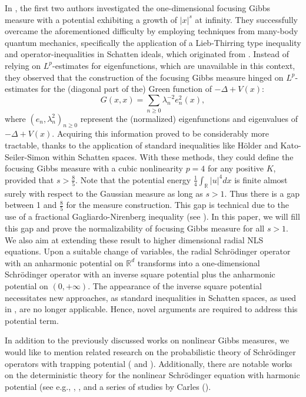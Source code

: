 \documentclass[%
11pt,  reqno]{amsart}
\theoremstyle{remarkstyle}
\newcommand{\1}{\hspace{0.2mm}\text{I}\hspace{0.2mm}}
\numberwithin{equation}{section}
\numberwithin{theorem}{section}
\begin{document}
	In \cite{DR23}, the first two authors investigated the one-dimensional focusing Gibbs measure with a potential exhibiting a growth of $|x|^s$ at infinity. They successfully overcame the aforementioned difficulty by employing techniques from many-body quantum mechanics, specifically the application of a Lieb-Thirring type inequality and operator-inequalities in Schatten ideals, which originated from \cite{LNR18}. Instead of relying on
	$L^p$-estimates for eigenfunctions, which are unavailable in this context, they observed that the construction of the focusing Gibbs measure hinged on $L^p$-estimates for the (diagonal part of the) Green function of $-\Delta + V(x)$:
	$$
	G(x,x) = \sum_{n\geq 0} \lambda_n^{-2} e^2_n(x),
	$$
	where $(e_n, \lambda_n^2)_{n\geq 0}$ represent the (normalized) eigenfunctions and eigenvalues of $-\Delta + V(x)$. Acquiring this information proved to be considerably more tractable, thanks to the application of standard inequalities like H\"older and Kato-Seiler-Simon within Schatten spaces. With these methods, they could define the focusing Gibbs measure with a cubic nonlinearity $p=4$ for any positive $K$, provided that $s>\frac{8}{5}$. Note that the potential energy $\frac{1}{4}\int_{\mathbb R} |u|^4 dx$ is finite almost surely with respect to the Gaussian measure as long as $s>1$. Thus there is a gap between 1 and $\frac{8}{5}$ for the measure construction. This gap is technical due to the use of a fractional Gagliardo-Nirenberg inequality (see \cite[Lemma 3.8]{DR23}). In this paper, we will fill this gap and prove the normalizability of focusing Gibbs measure for all $s>1$. We also aim at extending these result to higher dimensional radial NLS equations. Upon a suitable change of variables, the radial Schr\"odinger operator with an anharmonic potential on $\mathbb{R}^d$ transforms into a one-dimensional Schr\"odinger operator with an inverse square potential plus the anharmonic potential on $(0,+\infty)$. The appearance of the inverse square potential necessitates new approaches, as standard inequalities in Schatten spaces, as used in \cite{LNR18, DR23}, are no longer applicable. Hence, novel arguments are required to address this potential term.
	
	In addition to the previously discussed works on nonlinear Gibbs measures, we would like to mention related research on the probabilistic theory of Schrödinger operators with trapping potential (\cite{PoiRobTho-14} and \cite{RobTho-15}). Additionally, there are notable works on the deterministic theory for the nonlinear Schrödinger equation with harmonic potential (see e.g., \cite{KilVisZha-09}, \cite{Jao-16}, and a series of studies by Carles (\cite{Car-02, Car-03, Car-05, Car-11}).
	
\end{document}
